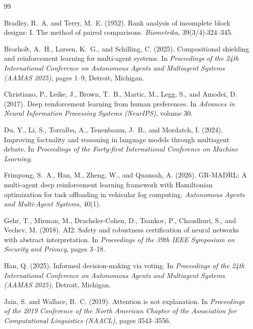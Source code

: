 \documentclass[12pt,a4paper]{article}
\begin{document}

\begin{thebibliography}{99}

Bradley, R.~A. and Terry, M.~E. (1952).
\newblock Rank analysis of incomplete block designs: I. The method of paired comparisons.
\newblock \emph{Biometrika}, 39(3/4):324--345.

Brorholt, A.~H., Larsen, K.~G., and Schilling, C. (2025).
\newblock Compositional shielding and reinforcement learning for multi-agent systems.
\newblock In \emph{Proceedings of the 24th International Conference on Autonomous Agents and Multiagent Systems (AAMAS 2025)}, pages 1--9, Detroit, Michigan.

Christiano, P., Leike, J., Brown, T.~B., Martic, M., Legg, S., and Amodei, D. (2017).
\newblock Deep reinforcement learning from human preferences.
\newblock In \emph{Advances in Neural Information Processing Systems (NeurIPS)}, volume 30.

Du, Y., Li, S., Torralba, A., Tenenbaum, J.~B., and Mordatch, I. (2024).
\newblock Improving factuality and reasoning in language models through multiagent debate.
\newblock In \emph{Proceedings of the Forty-first International Conference on Machine Learning}.

Frimpong, S.~A., Han, M., Zheng, W., and Quansah, A. (2026).
\newblock GR-MADRL: A multi-agent deep reinforcement learning framework with Hamiltonian optimization for task offloading in vehicular fog computing.
\newblock \emph{Autonomous Agents and Multi-Agent Systems}, 40(1).

Gehr, T., Mirman, M., Drachsler-Cohen, D., Tsankov, P., Chaudhuri, S., and Vechev, M. (2018).
\newblock AI2: Safety and robustness certification of neural networks with abstract interpretation.
\newblock In \emph{Proceedings of the 39th IEEE Symposium on Security and Privacy}, pages 3--18.

Han, Q. (2025).
\newblock Informed decision-making via voting.
\newblock In \emph{Proceedings of the 24th International Conference on Autonomous Agents and Multiagent Systems (AAMAS 2025)}, Detroit, Michigan.

Jain, S. and Wallace, B.~C. (2019).
\newblock Attention is not explanation.
\newblock In \emph{Proceedings of the 2019 Conference of the North American Chapter of the Association for Computational Linguistics (NAACL)}, pages 3543--3556.


\end{thebibliography}
\end{document}
